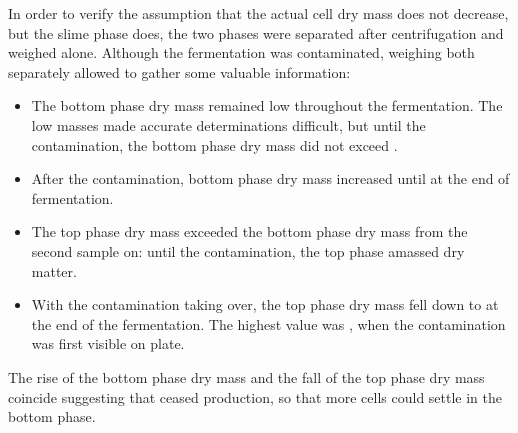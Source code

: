 In order to verify the assumption that the actual cell dry mass does not decrease, but the slime phase does, the two phases were separated after centrifugation and weighed alone. Although the fermentation was contaminated, weighing both separately allowed to gather some valuable information:
\begin{itemize}
	\item The bottom phase dry mass remained low throughout the fermentation. The low masses made accurate determinations difficult, but until the contamination, the bottom phase dry mass did not exceed .
	\item After the contamination, bottom phase dry mass increased until  at the end of fermentation.
	\item The top phase dry mass exceeded the bottom phase dry mass from the second sample on: until the contamination, the top phase amassed  dry matter.
	\item With the contamination taking over, the top phase dry mass fell down to  at the end of the fermentation. The highest value was , when the contamination was first visible on plate.
\end{itemize}
The rise of the bottom phase dry mass and the fall of the top phase dry mass coincide suggesting that \strain{} ceased \eps{} production, so that more cells could settle in the bottom phase.


